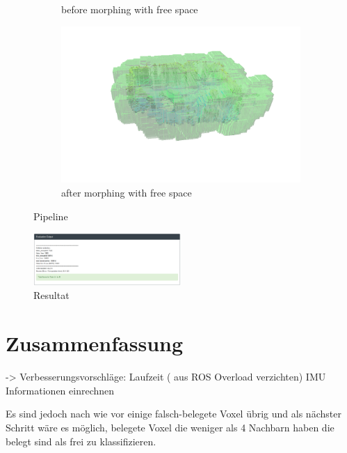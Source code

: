 \documentclass[12pt,titlepage, a4paper]{article}
\begin{document}
\begin{figure}[h!]
\begin{subfigure}[h]{0.45\textwidth}
		\caption{before morphing with free space}
	\end{subfigure}
	\begin{subfigure}[h]{0.45\textwidth}
		\includegraphics[width=\textwidth]{./maps/afterMorph_free.png}
		\caption{after morphing with free space}
	\end{subfigure}
 \caption{Pipeline}
\end{figure}

\begin{figure}[h!]
 \centering
 \includegraphics[width=0.5\textwidth]{./Screens/evaltask2.png}
 \caption{Resultat}
\end{figure}

\FloatBarrier

\section{Zusammenfassung}

-> Verbesserungsvorschläge:
Laufzeit ( aus ROS Overload verzichten)
IMU Informationen einrechnen

Es sind jedoch nach wie vor einige falsch-belegete Voxel übrig und als nächster Schritt wäre es möglich, belegete Voxel die weniger als 4 Nachbarn haben die belegt sind als frei zu klassifizieren.
\end{document}
